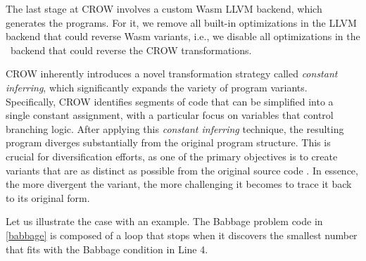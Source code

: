 The last stage at CROW involves a custom Wasm LLVM backend, which generates the \wasm programs.
For it, we remove all built-in optimizations in the LLVM backend that could reverse Wasm variants, i.e., we disable all optimizations in the \wasm\ backend that could reverse the CROW transformations.

\vspace{-2cm}

\label{CROW:constant_inferring}
CROW inherently introduces a novel transformation strategy called \emph{constant inferring}, which significantly expands the variety of \Wasm program variants. 
Specifically, CROW identifies segments of code that can be simplified into a single constant assignment, with a particular focus on variables that control branching logic. 
After applying this \emph{constant inferring} technique, the resulting program diverges substantially from the original program structure. 
This is crucial for diversification efforts, as one of the primary objectives is to create variants that are as distinct as possible from the original source code \cite{somepaper}. 
In essence, the more divergent the variant, the more challenging it becomes to trace it back to its original form.




Let us illustrate the case with an example.
The Babbage problem code in \autoref{babbage} is composed of a loop that stops when it discovers the smallest number that fits with the Babbage condition in Line 4.


